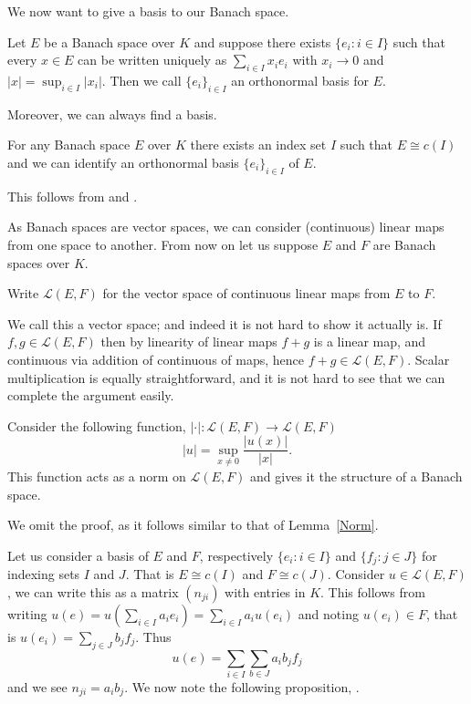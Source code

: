 We now want to give a basis to our Banach space.

\begin{definition}
    Let $E$ be a Banach space over $K$ and suppose there exists $\{ e_i : i \in I \}$ such that every $x \in E$ can be written uniquely as $\sum_{i \in I} x_i e_i$ with $x_i \to 0$ and $|x| = \sup_{i \in I} | x_i |$. Then we call $\{e_i\}_{i \in I}$ an orthonormal basis for $E$.
\end{definition}

Moreover, we can always find a basis.

\begin{lemma}
    For any Banach space $E$ over $K$ there exists an index set $I$ such that $E  \cong c(I)$ and we can identify an orthonormal basis $\{ e_i\}_{i \in I}$ of $E$.
\end{lemma}

This follows from \cite[Proposition~1]{Serre} and \cite[Lemma~1]{Serre}.

As Banach spaces are vector spaces, we can consider (continuous) linear maps from one space to another. From now on let us suppose $E$ and $F$ are Banach spaces over $K$.

\begin{definition}
     Write $\mathcal{L}(E,F)$ for the vector space of continuous linear maps from $E$ to $F$.
\end{definition}

\begin{remark}
    We call this a vector space; and indeed it is not hard to show it actually is. If $f,g \in \mathcal{L}(E,F)$ then by linearity of linear maps $f + g$ is a linear map, and continuous via addition of continuous of maps, hence $f + g \in \mathcal{L}(E,F)$. Scalar multiplication is equally straightforward, and it is not hard to see that we can complete the argument easily.
\end{remark}

\begin{lemma}
   Consider the following function, $| \cdot | : \mathcal{L}(E,F) \to \mathcal{L}(E,F)$
    \[
    |u| = \sup_{x\neq 0} \frac{|u(x)|}{|x|}.
    \]
    This function acts as a norm on $\mathcal{L}(E,F)$ and gives it the structure of a Banach space.
\end{lemma}

We omit the proof, as it follows similar to that of Lemma~\ref{Norm}.

Let us consider a basis of $E$ and $F$, respectively $\{e_i : i \in I \}$ and $\{ f_j : j \in J \}$ for indexing sets $I$ and $J$. That is $E \cong c(I)$ and $F \cong c(J)$. Consider $u \in \mathcal{L}(E,F)$, we can write this as a matrix $(n_{ji})$ with entries in $K$. This follows from writing $u(e) = u(\sum_{i \in I} a_i e_i) = \sum_{i \in I} a_i u(e_i)$ and noting $u(e_i) \in F$, that is $u(e_i) = \sum_{j \in J} b_j f_j$. Thus
\[
u(e) = \sum_{i \in I} \sum_{b \in J} a_i b_j f_j
\]
and we see $n_{ji} = a_i b_j$.
We now note the following proposition, \cite[Proposition~3]{Serre}.

